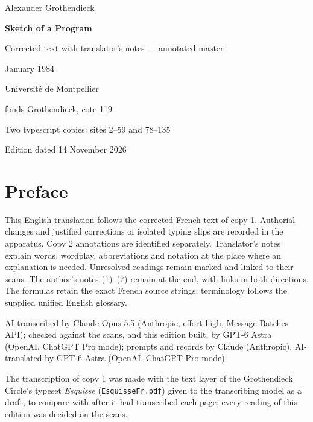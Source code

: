\documentclass[11pt,a4paper]{article}
\newcommand{\EditionTitle}{Sketch of a Program}
\newcommand{\EditionForm}{Corrected text with translator’s notes — annotated master}
\begin{document}
\hypersetup{pageanchor=false}
\begin{titlepage}
\centering
\vspace*{18mm}
{\Large Alexander Grothendieck\par}
\vspace{12mm}
{\Huge\bfseries\EditionTitle\par}
\vspace{8mm}
{\Large\EditionForm\par}
\vspace{14mm}
{\large January 1984\par}
\vfill
{\large Université de Montpellier\par fonds Grothendieck, cote 119\par}
\vspace{8mm}
{\normalsize Two typescript copies: sites 2--59 and 78--135\par}
\vspace{8mm}
{\normalsize Edition dated 14 November 2026\par}
\end{titlepage}
\hypersetup{pageanchor=true}
\thispagestyle{plain}
\section*{Preface}

This English translation follows the corrected French text of copy 1. Authorial changes and justified corrections of isolated typing slips are recorded in the apparatus. Copy 2 annotations are identified separately. Translator’s notes explain words, wordplay, abbreviations and notation at the place where an explanation is needed. Unresolved readings remain marked and linked to their scans. The author’s notes (1)–(7) remain at the end, with links in both directions. The formulas retain the exact French source strings; terminology follows the supplied unified English glossary.

\smallskip
AI-transcribed by Claude Opus 5.5 (Anthropic, effort high, Message Batches API); checked against the scans, and this edition built, by GPT-6 Astra (OpenAI, ChatGPT Pro mode); prompts and records by Claude (Anthropic).
AI-translated by GPT-6 Astra (OpenAI, ChatGPT Pro mode).

The transcription of copy 1 was made with the text layer of the Grothendieck Circle's typeset \textit{Esquisse} (\texttt{EsquisseFr.pdf}) given to the transcribing model as a draft, to compare with after it had transcribed each page; every reading of this edition was decided on the scans.
\end{document}
